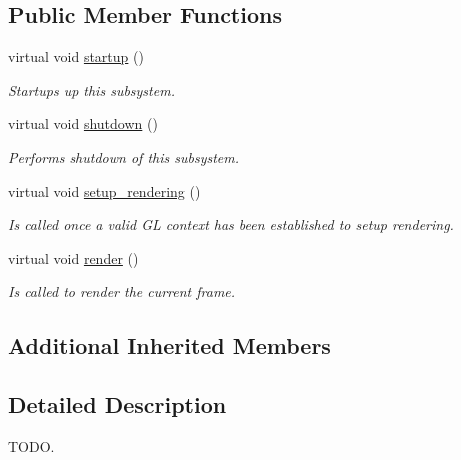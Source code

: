 \subsection*{Public Member Functions}
\begin{DoxyCompactItemize}
\item 
virtual void \hyperlink{class_p_x_subsystem_a8c051bb5e7277c6754647a53885b6348}{startup} ()
\begin{DoxyCompactList}\small\item\em Startups up this subsystem. \end{DoxyCompactList}\item 
virtual void \hyperlink{class_p_x_subsystem_adabd11441f7c81b81aba456f6d825279}{shutdown} ()
\begin{DoxyCompactList}\small\item\em Performs shutdown of this subsystem. \end{DoxyCompactList}\item 
virtual void \hyperlink{class_p_x_subsystem_ae2dba562627b2cc26cbc880942fc5a9b}{setup\+\_\+rendering} ()\hypertarget{class_p_x_subsystem_ae2dba562627b2cc26cbc880942fc5a9b}{}\label{class_p_x_subsystem_ae2dba562627b2cc26cbc880942fc5a9b}

\begin{DoxyCompactList}\small\item\em Is called once a valid GL context has been established to setup rendering. \end{DoxyCompactList}\item 
virtual void \hyperlink{class_p_x_subsystem_af83fe51fbfbabd65a3d261bd62bfbfb9}{render} ()\hypertarget{class_p_x_subsystem_af83fe51fbfbabd65a3d261bd62bfbfb9}{}\label{class_p_x_subsystem_af83fe51fbfbabd65a3d261bd62bfbfb9}

\begin{DoxyCompactList}\small\item\em Is called to render the current frame. \end{DoxyCompactList}\end{DoxyCompactItemize}
\subsection*{Additional Inherited Members}


\subsection{Detailed Description}
T\+O\+DO. 

